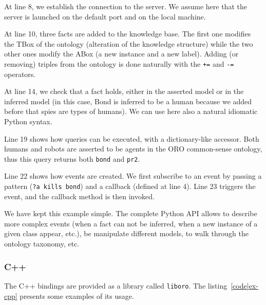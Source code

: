 At line 8, we establish the connection to the server. We assume here that the
server is launched on the default port and on the local machine.

At line 10, three facts are added to the knowledge base. The first one modifies
the TBox of the ontology (alteration of the knowledge structure) while the two
other ones modify the ABox (a new instance and a new label). Adding (or
removing) triples from the ontology is done naturally with the {\tt +=} and
{\tt -=} operators.

At line 14, we check that a fact holds, either in the asserted model or in the
inferred model (in this case, Bond is inferred to be a human because we added
before that spies are types of humans). We can use here also a natural
idiomatic Python syntax.

Line 19 shows how queries can be executed, with a dictionary-like accessor.
Both humans and robots are asserted to be agents in the ORO common-sense
ontology, thus this query returns both {\tt bond} and {\tt pr2}.

Line 22 shows how events are created. We first subscribe to an event by passing
a pattern ({\tt ?a kills bond}) and a callback (defined at line 4).  Line 23
triggers the event, and the callback method is then invoked.

We have kept this example simple. The complete Python API allows to describe
more complex events (when a fact can not be inferred, when a new instance of a
given class appear, etc.), be manipulate different models, to walk through the
ontology taxonomy, etc.

\subsubsection{C++}

The C++ bindings are provided as a library called {\tt liboro}. The
listing~\ref{code|ex-cpp} presents some examples of its usage.

